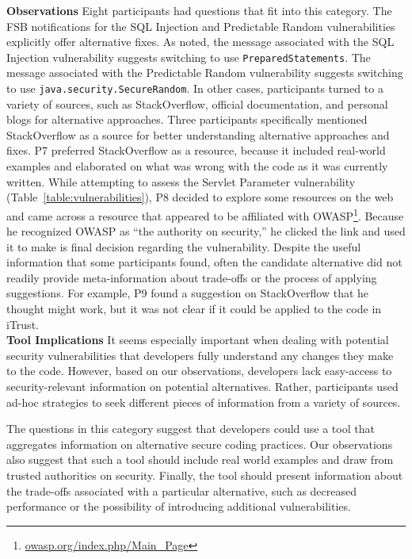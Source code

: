 \documentclass[conference]{IEEEtran}
\begin{document}
\noindent\textbf{Observations}
Eight participants had questions that fit into this category. 
The FSB notifications for the SQL Injection and Predictable Random vulnerabilities explicitly offer alternative fixes. 
As noted, the message associated with the SQL Injection vulnerability suggests switching to use \texttt{PreparedStatements}. 
The message associated with the Predictable Random vulnerability suggests switching to use \texttt{java.security.SecureRandom}. 
In other cases, participants turned to a variety of sources, such as StackOverflow, official documentation, and personal blogs for alternative approaches. 
Three participants specifically mentioned StackOverflow as a source for better understanding alternative approaches and fixes. 
P7 preferred StackOverflow as a resource, because it included real-world examples and elaborated on what was wrong with the code as it was currently written.  
While attempting to assess the Servlet Parameter vulnerability (Table~\ref{table:vulnerabilities}), P8 decided to explore some resources on the web and came across a resource that appeared to be affiliated with OWASP\footnote{\url{owasp.org/index.php/Main_Page}}. 
Because he recognized OWASP as ``the authority on security,'' he clicked the link and used it to make is final decision regarding the vulnerability. 
Despite the useful information that some participants found, often the candidate alternative did not readily provide meta-information about trade-offs or the process of applying suggestions. 
For example, P9 found a suggestion on StackOverflow that he thought might work, but it was not clear if it could be applied to the code in iTrust. 
\\

\noindent\textbf{Tool Implications} 
It seems especially important when dealing with potential security vulnerabilities that developers fully understand any changes they make to the code. 
However, based on our observations, developers lack easy-access to security-relevant information on potential alternatives. 
Rather, participants used ad-hoc strategies to seek different pieces of information from a variety of sources. 

The questions in this category suggest that developers could use a tool that aggregates information on alternative secure coding practices.
Our observations also suggest that such a tool should include real world examples and draw from trusted authorities on security.
Finally, the tool should present information about the trade-offs associated with a particular alternative, such as decreased performance or the possibility of introducing additional vulnerabilities. 
\end{document}
